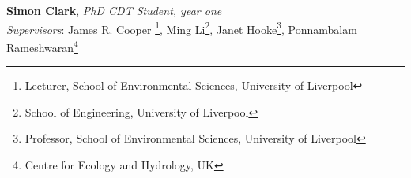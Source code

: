 \documentclass[11pt]{article}%
\begin{document}
\begin{minipage}{.25\linewidth}
\hfill
\end{minipage}














\cleardoublepage

\thispagestyle{studentProjects}

\begin{minipage}[t]{.99\linewidth} %
\hypertarget{Simon}{}
\end{minipage}

{\bf Simon Clark}, \textit{PhD CDT Student, year one}\\
\textit{Supervisors}: James R. Cooper \footnote{Lecturer, School of Environmental Sciences, University of Liverpool}, Ming Li\footnote{School of Engineering, University of Liverpool}, Janet Hooke\footnote{Professor, School of Environmental Sciences, University of Liverpool}, Ponnambalam Rameshwaran\footnote{Centre for Ecology and Hydrology, UK}\\

\vspace{-10pt}
\end{document}
